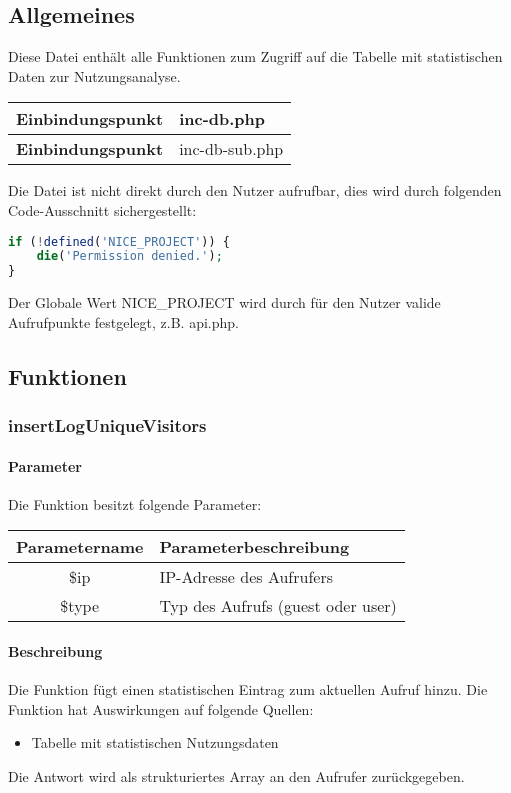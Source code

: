 \subsection{Allgemeines} Diese Datei enthält alle Funktionen zum Zugriff auf die Tabelle mit statistischen Daten zur Nutzungsanalyse.
\begin{table}[H]
	\begin{tabular}{|c|p{11cm}|}
		\hline
		\textbf{Einbindungspunkt} & inc-db.php \\ \hline
		\textbf{Einbindungspunkt} & inc-db-sub.php \\ \hline
	\end{tabular}
\end{table}
Die Datei ist nicht direkt durch den Nutzer aufrufbar, dies wird durch folgenden Code-Ausschnitt sichergestellt:
\begin{lstlisting}[language=php]
if (!defined('NICE_PROJECT')) {
	die('Permission denied.');
}
\end{lstlisting}
Der Globale Wert {\glqq NICE\_PROJECT\grqq} wird durch für den Nutzer valide Aufrufpunkte festgelegt, z.B. {\glqq api.php\grqq}.
\newpage
\subsection{Funktionen}
\subsubsection{insertLogUniqueVisitors}
\paragraph{Parameter} Die Funktion besitzt folgende Parameter:
\begin{table}[H]
	\begin{tabular}{|c|p{11cm}|}
		\hline
		\textbf{Parametername} & \textbf{Parameterbeschreibung} \\ \hline
		\$ip   & IP-Adresse des Aufrufers \\ \hline
		\$type & Typ des Aufrufs ({\glqq guest\grqq} oder {\glqq user\grqq}) \\ \hline
	\end{tabular}
\end{table}
\paragraph{Beschreibung} Die Funktion fügt einen statistischen Eintrag zum aktuellen Aufruf hinzu. Die Funktion hat Auswirkungen auf folgende Quellen:
\begin{itemize}
	\item Tabelle mit statistischen Nutzungsdaten
\end{itemize}
Die Antwort wird als strukturiertes Array an den Aufrufer zurückgegeben.
